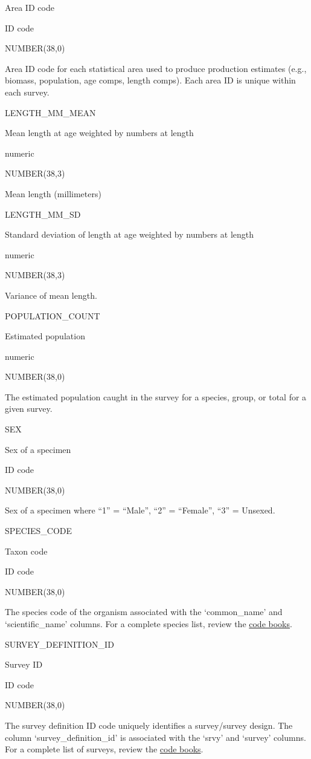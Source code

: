\documentclass[
  letterpaper,
  oneside,
  open=any]{scrbook}
\begin{document}
Area ID code

ID code

NUMBER(38,0)

Area ID code for each statistical area used to produce production
estimates (e.g., biomass, population, age comps, length comps). Each
area ID is unique within each survey.

LENGTH\_MM\_MEAN

Mean length at age weighted by numbers at length

numeric

NUMBER(38,3)

Mean length (millimeters)

LENGTH\_MM\_SD

Standard deviation of length at age weighted by numbers at length

numeric

NUMBER(38,3)

Variance of mean length.

POPULATION\_COUNT

Estimated population

numeric

NUMBER(38,0)

The estimated population caught in the survey for a species, group, or
total for a given survey.

SEX

Sex of a specimen

ID code

NUMBER(38,0)

Sex of a specimen where ``1'' = ``Male'', ``2'' = ``Female'', ``3'' =
Unsexed.

SPECIES\_CODE

Taxon code

ID code

NUMBER(38,0)

The species code of the organism associated with the `common\_name' and
`scientific\_name' columns. For a complete species list, review the
\href{https://www.fisheries.noaa.gov/resource/document/groundfish-survey-species-code-manual-and-data-codes-manual}{code
books}.

SURVEY\_DEFINITION\_ID

Survey ID

ID code

NUMBER(38,0)

The survey definition ID code uniquely identifies a survey/survey
design. The column `survey\_definition\_id' is associated with the
`srvy' and `survey' columns. For a complete list of surveys, review the
\href{https://www.fisheries.noaa.gov/resource/document/groundfish-survey-species-code-manual-and-data-codes-manual}{code
books}.
\end{document}
